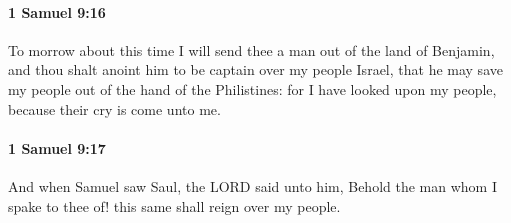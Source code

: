 		\paragraph{1 Samuel 9:16} %
			\label{1SAMUEL-9-16}

			To morrow about this time I will send thee a man out of the land of Benjamin, and thou shalt anoint him to be captain over my people Israel, that he may save my people out of the hand of the Philistines: for I have looked upon my people, because their cry is come unto me.


		\paragraph{1 Samuel 9:17} %
			\label{1SAMUEL-9-17}

			And when Samuel saw Saul, the LORD said unto him, Behold the man whom I spake to thee of! this same shall reign over my people.

